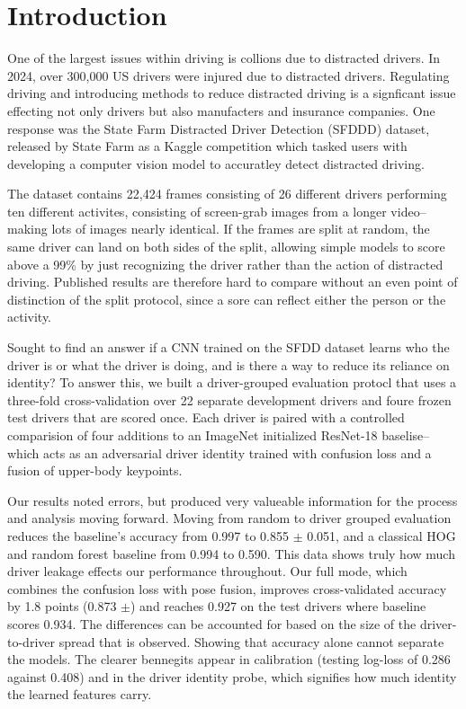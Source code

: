 \section{Introduction}
\label{sec:intro}

One of the largest issues within driving is collions due to distracted drivers.
In 2024, over 300,000 US drivers were injured due to distracted drivers\cite{nhstaStats}.
Regulating driving and introducing methods to reduce distracted driving is a signficant issue effecting not only drivers but also manufacters and insurance companies.
One response was the State Farm Distracted Driver Detection (SFDDD) dataset, released by State Farm as a Kaggle competition which tasked users with developing a computer vision model to accuratley detect distracted driving.

The dataset contains 22,424 frames consisting of 26 different drivers performing ten different activites, consisting of screen-grab images from a longer video--making lots of images nearly identical.
If the frames are split at random, the same driver can land on both sides of the split, allowing simple models to score above a 99\% by just recognizing the driver rather than the action of distracted driving.
Published results are therefore hard to compare without an even point of distinction of the split protocol, since a sore can reflect either the person or the activity.

Sought to find an answer if a CNN trained on the SFDD dataset learns who the driver is or what the driver is doing, and is there a way to reduce its reliance on identity?
To answer this, we built a driver-grouped evaluation protocl that uses a three-fold cross-validation over 22 separate development drivers and foure frozen test drivers that are scored once.
Each driver is paired with a controlled comparision of four additions to an ImageNet initialized ResNet-18 baselise--which acts as an adversarial driver identity trained with confusion loss and a fusion of upper-body keypoints.

Our results noted errors, but produced very valueable information for the process and analysis moving forward.
Moving from random to driver grouped evaluation reduces the baseline's accuracy from 0.997 to 0.855 $\pm$ 0.051, and a classical HOG and random forest baseline from 0.994 to 0.590.
This data shows truly how much driver leakage effects our performance throughout.
Our full mode, which combines the confusion loss with pose fusion, improves cross-validated accuracy by 1.8 points (0.873 $\pm$) and reaches 0.927 on the test drivers where baseline scores 0.934.
The differences can be accounted for based on the size of the driver-to-driver spread that is observed.
Showing that accuracy alone cannot separate the models.
The clearer bennegits appear in calibration (testing log-loss of 0.286 against 0.408) and in the driver identity probe, which signifies how much identity the learned features carry.

